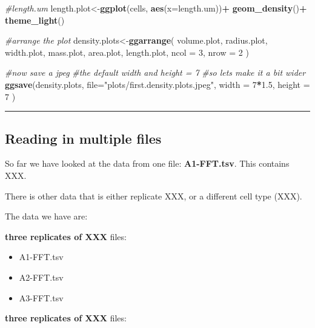 \documentclass[
]{article}
\newenvironment{Shaded}{\begin{snugshade}}{\end{snugshade}}
\newcommand{\AttributeTok}[1]{\textcolor[rgb]{0.13,0.29,0.53}{#1}}
\newcommand{\CommentTok}[1]{\textcolor[rgb]{0.56,0.35,0.01}{\textit{#1}}}
\newcommand{\DecValTok}[1]{\textcolor[rgb]{0.00,0.00,0.81}{#1}}
\newcommand{\FloatTok}[1]{\textcolor[rgb]{0.00,0.00,0.81}{#1}}
\newcommand{\FunctionTok}[1]{\textcolor[rgb]{0.13,0.29,0.53}{\textbf{#1}}}
\newcommand{\NormalTok}[1]{#1}
\newcommand{\OtherTok}[1]{\textcolor[rgb]{0.56,0.35,0.01}{#1}}
\newcommand{\SpecialCharTok}[1]{\textcolor[rgb]{0.81,0.36,0.00}{\textbf{#1}}}
\newcommand{\StringTok}[1]{\textcolor[rgb]{0.31,0.60,0.02}{#1}}
\providecommand{\tightlist}{%
  \setlength{\itemsep}{0pt}\setlength{\parskip}{0pt}}
\begin{document}
\begin{Shaded}
\begin{Highlighting}[]
\CommentTok{\#length.um}
\NormalTok{length.plot}\OtherTok{\textless{}{-}}\FunctionTok{ggplot}\NormalTok{(cells, }\FunctionTok{aes}\NormalTok{(}\AttributeTok{x=}\NormalTok{length.um))}\SpecialCharTok{+}
  \FunctionTok{geom\_density}\NormalTok{()}\SpecialCharTok{+}
  \FunctionTok{theme\_light}\NormalTok{()}

\CommentTok{\#arrange the plot}
\NormalTok{density.plots}\OtherTok{\textless{}{-}}\FunctionTok{ggarrange}\NormalTok{(}
\NormalTok{  volume.plot,}
\NormalTok{  radius.plot,}
\NormalTok{  width.plot, }
\NormalTok{  mass.plot, }
\NormalTok{  area.plot,}
\NormalTok{  length.plot,}
  \AttributeTok{ncol =} \DecValTok{3}\NormalTok{, }
  \AttributeTok{nrow =} \DecValTok{2}
\NormalTok{)}

\CommentTok{\#now save a jpeg}
\CommentTok{\#the default width and height = 7}
\CommentTok{\#so lets make it a bit wider}
\FunctionTok{ggsave}\NormalTok{(density.plots,}
  \AttributeTok{file=}\StringTok{"plots/first.density.plots.jpeg"}\NormalTok{,}
  \AttributeTok{width =} \DecValTok{7}\SpecialCharTok{*}\FloatTok{1.5}\NormalTok{,}
  \AttributeTok{height =} \DecValTok{7}
\NormalTok{)}
\end{Highlighting}
\end{Shaded}

\begin{center}\rule{0.5\linewidth}{0.5pt}\end{center}

\hypertarget{reading-in-multiple-files}{%
\subsection{Reading in multiple files}\label{reading-in-multiple-files}}

So far we have looked at the data from one file: \textbf{A1-FFT.tsv}.
This contains XXX.

There is other data that is either replicate XXX, or a different cell
type (XXX).

The data we have are:

\textbf{three replicates of XXX} files:

\begin{itemize}
\tightlist
\item
  A1-FFT.tsv
\item
  A2-FFT.tsv\\
\item
  A3-FFT.tsv
\end{itemize}

\textbf{three replicates of XXX} files:
\end{document}
